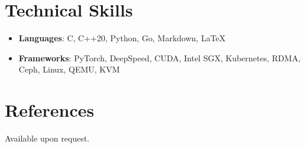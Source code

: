 \documentclass[letterpaper,oneside,11pt]{article}
\newcommand{\resumeItem}[2]{
  \item\small{
    \textbf{#1}{: #2 \vspace{-3pt}}
  }
}
\newcommand{\resumeSubHeadingListStart}{\begin{itemize}[leftmargin=*]}
\newcommand{\resumeSubHeadingListEnd}{\end{itemize}}
\begin{document}
%
\section{Technical Skills}
 \resumeSubHeadingListStart
  \resumeItem{Languages}{C, C++20, Python, Go, Markdown, \LaTeX}
  \resumeItem{Frameworks}{PyTorch, DeepSpeed, CUDA, Intel SGX, Kubernetes, RDMA, Ceph, Linux, QEMU, KVM}
 \resumeSubHeadingListEnd

\section{References}
Available upon request.
\end{document}
